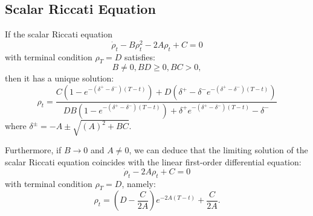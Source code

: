\documentclass[11pt]{article}
\begin{document}
\begin{appendices}
\subsection*{\textbf{Scalar Riccati Equation}} If the scalar Riccati equation 
	\begin{equation*}
		\dot{\rho}_t - B \rho_t^2 - 2A \rho_t  + C = 0 
	\end{equation*}
	with terminal condition $\rho_T = D$ satisfies:
	\begin{equation}
		B \neq 0, BD \geq 0, BC>0,
	\label{eq:Riccati_assumptions}
	\end{equation}
	then it has a unique solution:
\begin{equation}
		\rho_t= \frac{C(1-e^{-(\delta^+ - \delta^-)(T-t)})+D( \delta^+ -\delta^-e^{-(\delta^+ - \delta^-)(T-t)}) }{D B(1-e^{-(\delta^+ - \delta^-)(T-t)})+ \delta^+e^{-(\delta^+ - \delta^-)(T-t)}  -\delta^- }
	\label{eq:riccati_ut_sol_app}
\end{equation}
	where $\delta^\pm = -A \pm \sqrt{(A)^2 + B C}$.
	
	Furthermore, if $B \to 0$ and $A\neq 0$, we can deduce that the limiting solution of the scalar Riccati equation coincides with the linear first-order differential equation:
	\begin{equation*}
		\dot{\rho}_t - 2A \rho_t +C = 0 
	\end{equation*}
	with terminal condition $\rho_T = D$, namely:
	\begin{equation*}
		\rho_t = \left(D - \frac{C}{2A} \right) e^{-2A (T-t)} + \frac{C}{2A}.
	\end{equation*}
	

\end{appendices}
\end{document}
